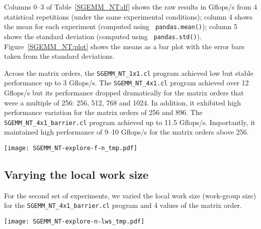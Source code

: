 \documentclass{acm_proc_article-sp} %
\begin{document}
Columns 0--3 of Table~\ref{SGEMM_NT:df} shows the raw results in
Gflops/s from 4 statistical repetitions (under the same experimental
conditions); column 4 shows the mean for each experiment (computed using {\tt
pandas.mean()}); column 5 shows the standard deviation (computed using {\tt
pandas.std()}).
%
Figure~\ref{SGEMM_NT:plot} shows the means as a bar plot with the error bars
taken from the standard deviations.

Across the matrix orders, the \verb|SGEMM_NT_1x1.cl| program achieved
low but stable performance up to 3 Gflops/s.
%
The \verb|SGEMM_NT_4x1.cl| program achieved over 12 Gflops/s but its
performance dropped dramatically for the matrix orders that were a multiple of
256: 256, 512, 768 and 1024.
%
In addition, it exhibited high performance variation for the matrix orders of
256 and 896.
%
The \verb|SGEMM_NT_4x1_barrier.cl| program achieved up to 11.5
Gflops/s. Importantly, it maintained high performance of 9--10 Gflops/s
for the matrix orders above 256.


\begin{table*}
  \centering
  \caption{\label{SGEMM_NT:df}The performance of 3 SGEMM NT kernels: {\tt pandas} DataFrame with raw results.}
  
\end{table*}

\begin{figure*}
  \texttt{[image: SGEMM\_NT-explore-f-n\_tmp.pdf]}
  \caption{The performance of 3 SGEMM NT kernels: {\tt matplotlib} bar plot with error bars.}
  \label{SGEMM_NT:plot}
\end{figure*}


\subsection{Varying the local work size}
\label{sec:lws}

For the second set of experiments, we varied the local work size (work-group
size) for the \verb|SGEMM_NT_4x1_barrier.cl| program and 4 values of the
matrix order.
%

\begin{sidewaysfigure*}
  \texttt{[image: SGEMM\_NT-explore-n-lws\_tmp.pdf]}
  \caption{The performance of {\tt SGEMM\_NT\_4x1\_barrier.cl} across local work sizes: {\tt matplotlib} bar plot with error bars.}
  \label{SGEMM_NT:plot:lws}
\end{sidewaysfigure*}
\end{document}
